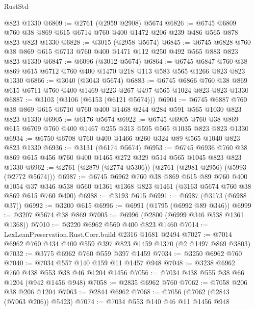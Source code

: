 \begin{lexlean}{RustStd}
\begin{coremodule}
    @823
    @1330
@6809 := @2761 (@2959 @2908) @5674
@6826 := @6745
    @6809
    @760
    @38
    @869
    @615
    @6714
    @760
    @400
    @1472
    @206
    @239
    @486
    @565
    @878
    @823
    @823
    @1330
@6828 := @3015 (@2958 @5674)
@6845 := @6745
    @6828
    @760
    @38
    @869
    @615
    @6713
    @760
    @400
    @1471
    @112
    @250
    @492
    @565
    @883
    @823
    @823
    @1330
@6847 := @6096 (@3012 @5674)
@6864 := @6745
    @6847
    @760
    @38
    @869
    @615
    @6712
    @760
    @400
    @1470
    @218
    @113
    @583
    @565
    @1266
    @823
    @823
    @1330
@6866 := @3040 (@3043 @5674)
@6883 := @6745
    @6866
    @760
    @38
    @869
    @615
    @6711
    @760
    @400
    @1469
    @223
    @267
    @497
    @565
    @1024
    @823
    @823
    @1330
@6887 := @3103 (@3106 (@6153 (@6121 @5674)))
@6904 := @6745
    @6887
    @760
    @38
    @869
    @615
    @6710
    @760
    @400
    @1468
    @244
    @284
    @591
    @565
    @1030
    @823
    @823
    @1330
@6905 := @6176 @5674
@6922 := @6745
    @6905
    @760
    @38
    @869
    @615
    @6709
    @760
    @400
    @1467
    @255
    @313
    @595
    @565
    @1035
    @823
    @823
    @1330
@6934 := @6750 @6708 @760 @400 @1466 @260 @324 @89 @565 @1040 @823 @823 @1330
@6936 := @3131 (@6174 @5674)
@6953 := @6745
    @6936
    @760
    @38
    @869
    @615
    @456
    @760
    @400
    @1465
    @272
    @329
    @514
    @565
    @1045
    @823
    @823
    @1330
@6962 := @2761 (@2879 (@2774 @5306)) (@2761 (@2981 @2956) (@5993 (@2772 @5674)))
@6987 := @6745
    @6962
    @760
    @38
    @869
    @615
    @89
    @760
    @400
    @1054
    @37
    @346
    @538
    @560
    @1361
    @1368
    @823
    @1461
    (@3163 @5674 @760 @38 @869 @615 @760 @400)
@6988 := @3193 @615
@6991 := @6987 (@3173 (@6988 @37))
@6992 := @3200 @615
@6996 := @6991 (@1795 (@6992 @89 @346))
@6999 := @3207 @5674 @38 @869
@7005 := @6996 (@2800 (@6999 @346 @538 @1361 @1368))
@7010 := @3220 @6962 @560 @400 @823 @1460
@7014 := LexLeanPreservation.Rust.Corr.build @2316 @1681 @2494
@7027 := @7014 @6962 @760 @434 @400 @559 @397 @823 @1459 @1370 (@2 @1497 @869 @3803)
@7032 := @3775 @6962 @760 @559 @397 @1459
@7034 := @3250 @6962 @760
@7040 := @7034 @557 @140 @159 @11 @1457 @948
@7048 := @3238 @6962 @760 @438 @553 @38 @46 @1204 @1456
@7056 := @7034 @438 @555 @38 @66 @1204 (@942 @1456 @948)
@7058 := @2835 @6962 @760
@7062 := @7058 @206 @38 @206 @1204
@7063 := @2844 @6962
@7068 := @7056 (@7062 (@2843 (@7063 @206)) @5423)
@7074 := @7034 @553 @140 @46 @11 @1456 @948

\end{coremodule}
\end{lexlean}
